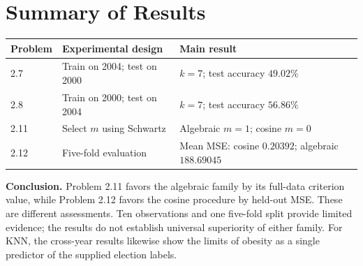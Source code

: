 \documentclass[11pt,a4paper]{article}
\begin{document}
\section*{Summary of Results}
\begin{center}\small
\begin{tabularx}{\linewidth}{l >{\raggedright\arraybackslash}X >{\raggedright\arraybackslash}X}
\toprule
Problem & Experimental design & Main result\\\midrule
2.7 & Train on 2004; test on 2000 & $k=7$; test accuracy $49.02\%$\\
2.8 & Train on 2000; test on 2004 & $k=7$; test accuracy $56.86\%$\\
2.11 & Select $m$ using Schwartz & Algebraic $m=1$; cosine $m=0$\\
2.12 & Five-fold evaluation & Mean MSE: cosine $0.20392$; algebraic $188.69045$\\
\bottomrule
\end{tabularx}\end{center}

\textbf{Conclusion.} Problem 2.11 favors the algebraic family by its full-data criterion value, while Problem 2.12 favors the cosine procedure by held-out MSE. These are different assessments. Ten observations and one five-fold split provide limited evidence; the results do not establish universal superiority of either family. For KNN, the cross-year results likewise show the limits of obesity as a single predictor of the supplied election labels.
\end{document}
